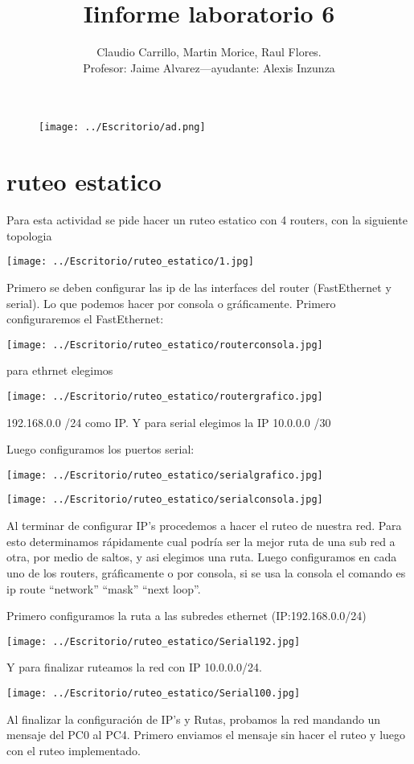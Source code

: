 \documentclass[11pt,a4paper]{report}
\author{Claudio Carrillo, Martin Morice, Raul Flores. \\ Profesor: Jaime Alvarez---ayudante: Alexis Inzunza}
\title{Iinforme laboratorio 6}
\begin{document}
\begin{figure}[hbtp]
\texttt{[image: ../Escritorio/ad.png]}
\end{figure}

\maketitle
\part{ruteo estatico}
	Para esta actividad se pide hacer un ruteo estatico con 4 routers, con la siguiente topologia
	
\texttt{[image: ../Escritorio/ruteo\_estatico/1.jpg]} 
	
	Primero se deben configurar las ip de las interfaces del router (FastEthernet y serial). Lo que podemos hacer por consola o gráficamente. Primero configuraremos el FastEthernet:
	
\texttt{[image: ../Escritorio/ruteo\_estatico/routerconsola.jpg]} 	

	para ethrnet elegimos
	
\texttt{[image: ../Escritorio/ruteo\_estatico/routergrafico.jpg]}  

192.168.0.0 /24 como IP. Y para serial elegimos la IP 10.0.0.0 /30

Luego configuramos los puertos serial:

\texttt{[image: ../Escritorio/ruteo\_estatico/serialgrafico.jpg]} 

\texttt{[image: ../Escritorio/ruteo\_estatico/serialconsola.jpg]} 
  
Al terminar de configurar IP’s procedemos a hacer el ruteo de nuestra red. Para esto determinamos rápidamente cual podría ser la mejor ruta de una sub red a otra, por medio de saltos, y asi elegimos una ruta. Luego configuramos en cada uno de los routers, gráficamente o por consola, si se usa la consola el comando es ip route “network” “mask” “next loop”.

Primero configuramos la ruta a las subredes ethernet (IP:192.168.0.0/24)

\texttt{[image: ../Escritorio/ruteo\_estatico/Serial192.jpg]} 
  
Y para finalizar ruteamos la red con IP 10.0.0.0/24.

\texttt{[image: ../Escritorio/ruteo\_estatico/Serial100.jpg]}

Al finalizar la configuración de IP’s y Rutas, probamos la red mandando un mensaje del PC0 al PC4. Primero enviamos el mensaje sin hacer el ruteo y luego con el ruteo implementado.
\end{document}
